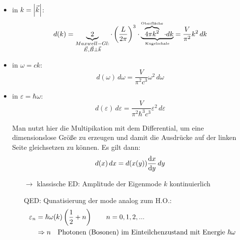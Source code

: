 \begin{itemize}
    \item in $k = \abs{\Vec{k}}$:
    \begin{equation}
        d(k) = \underbrace{2}_{\substack{Maxwell-Gl: \\ \Vec{E},\Vec{B} \perp \Vec{k}}} \cdot \left(\frac{L}{2\pi}\right)^3 \cdot \underbrace{\overbrace{4\pi k^2}^{\text{\tiny Oberfläche}} \cdot dk}_{\text{\tiny Kugelschale}} = \frac{V}{\pi^2} k^2 \, dk
    \end{equation}
    \item in $\omega = ck$:
    \begin{equation}
        d(\omega) \, d\omega = \frac{V}{\pi^2c^3} \omega^2 \, d\omega
    \end{equation}
    \item in $\varepsilon=\hbar \omega$:
    \begin{equation}
        d(\varepsilon) \, d\varepsilon = \frac{V}{\pi^2\hbar^3c^3} \varepsilon^2\, d\varepsilon
    \end{equation}
    \item[] \color{black!40} Man nutzt hier die Multipikation mit dem Differential, um eine dimensionslose Größe zu erzeugen und damit die Ausdrücke auf der linken Seite gleichsetzen zu können. Es gilt dann:
    \begin{equation}
         d(x) \, dx = d(x(y)) \dv{x}{y} \, dy
    \end{equation}
    \begin{itemize}\color{black}
        \item[$\rightarrow$] klassische ED: Amplitude der Eigenmode $k$ kontinuierlich
        \item[] QED: Qunatisierung der mode analog zum H.O.:
        \begin{align}
            \varepsilon_n &= \hbar \omega(k) \left(\frac{1}{2}+n\right) \qquad n=0,1,2,...\\
            &\Rightarrow n \qq{Photonen (Bosonen) im Einteilchenzustand mit Energie $\hbar \omega$}
        \end{align}
    \end{itemize}
\end{itemize}

